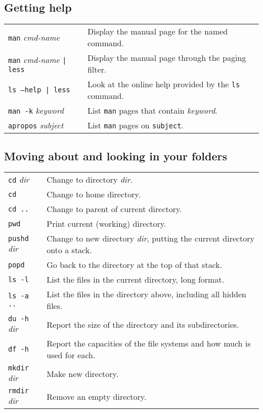 \subsection*{Getting help}
\begin{tabular}{l|l}
 \texttt{man} \textit{cmd-name} & Display the manual page for the named command. \\
 \texttt{man} \textit{cmd-name} \texttt{| less} & Display the manual page through the paging filter. \\
 \texttt{ls --help | less} & Look at the online help provided by the \texttt{ls} command. \\
 \texttt{man -k} \textit{keyword} & List \texttt{man} pages that contain \textit{keyword}. \\
 \texttt{apropos} \textit{subject} & List \texttt{man} pages on \texttt{subject}. \\
\end{tabular}
 
\subsection*{Moving about and looking in your folders}
\begin{tabular}{l|l}
 \texttt{cd} \textit{dir} & Change to directory \textit{dir}. \\
 \texttt{cd} & Change to home directory. \\
 \texttt{cd ..} & Change to parent of current directory. \\
 \texttt{pwd} & Print current (working) directory. \\
 \texttt{pushd} \textit{dir} & \parbox{0.8\textwidth}{Change to new directory \textit{dir}, 
   putting the current directory onto a stack.} \\
 \texttt{popd} & Go back to the directory at the top of that stack. \\
 \texttt{ls -l} & List the files in the current directory, long format. \\
 \texttt{ls -a ..} & List the files in the directory above, including all hidden files. \\
 \texttt{du -h} \textit{dir} & Report the size of the directory and its subdirectories. \\
 \texttt{df -h} & Report the capacities of the file systems and how much is used for each. \\
 \texttt{mkdir} \textit{dir} & Make new directory. \\
 \texttt{rmdir} \textit{dir} & Remove an empty directory. \\
\end{tabular}

